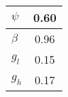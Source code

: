 \begin{tiny}\begin{tabular}{|l|c|}
\hline
\textbf{$\psi$}&0.60\\\hline
\textbf{$\beta$}&0.96\\\hline
\textbf{$g_{l}$}&0.15\\\hline
\textbf{$g_{h}$}&0.17\\\hline
\end{tabular}
\end{tiny}